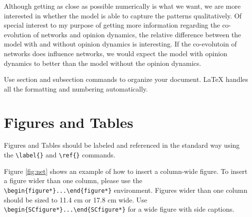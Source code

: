 \documentclass[9pt,twocolumn,twoside]{ilcss}
\begin{document}
Although getting as close as possible numerically is what we want, we are more interested in whether the model is able to capture the patterns qualitatively. 
Of special interest to my purpose of getting more information regarding the co-evolution of networks and opinion dynamics, the relative difference between the model with and without opinion dynamics is interesting.
If the co-evolutoin of networks does influence networks, we would expect the model with opinion dynamics to better than the model without the opinion dynamics. 













Use section and subsection commands to organize your document. \LaTeX{} handles all the formatting and numbering automatically. 

\section{Figures and Tables}

Figures and Tables should be labeled and referenced in the standard way using the \verb|\label{}| and \verb|\ref{}| commands.




Figure \ref{fig:net} shows an example of how to insert a column-wide figure. To insert a figure wider than one column, please use the \verb|\begin{figure*}...\end{figure*}| environment. Figures wider than one column should be sized to 11.4 cm or 17.8 cm wide. Use \verb|\begin{SCfigure*}...\end{SCfigure*}| for a wide figure with side captions.
\end{document}

